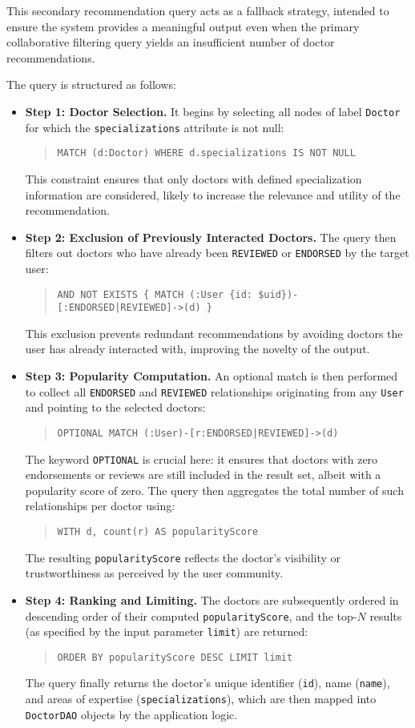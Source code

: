 This secondary recommendation query acts as a fallback strategy, intended to ensure the system provides a meaningful output even when the primary collaborative filtering query yields an insufficient number of doctor recommendations.

The query is structured as follows:
\begin{itemize}
	\item \textbf{Step 1: Doctor Selection.} It begins by selecting all nodes of label \texttt{Doctor} for which the \texttt{specializations} attribute is not null:
	\begin{quote}
		\texttt{MATCH (d:Doctor) WHERE d.specializations IS NOT NULL}
	\end{quote}
	This constraint ensures that only doctors with defined specialization information are considered, likely to increase the relevance and utility of the recommendation.
	
	\item \textbf{Step 2: Exclusion of Previously Interacted Doctors.} The query then filters out doctors who have already been \texttt{REVIEWED} or \texttt{ENDORSED} by the target user:
	\begin{quote}
		\texttt{AND NOT EXISTS \{ MATCH (:User \{id: \$uid\})-[:ENDORSED|REVIEWED]->(d) \}}
	\end{quote}
	This exclusion prevents redundant recommendations by avoiding doctors the user has already interacted with, improving the novelty of the output.
	
	\item \textbf{Step 3: Popularity Computation.} An optional match is then performed to collect all \texttt{ENDORSED} and \texttt{REVIEWED} relationships originating from any \texttt{User} and pointing to the selected doctors:
	\begin{quote}
		\texttt{OPTIONAL MATCH (:User)-[r:ENDORSED|REVIEWED]->(d)}
	\end{quote}
	The keyword \texttt{OPTIONAL} is crucial here: it ensures that doctors with zero endorsements or reviews are still included in the result set, albeit with a popularity score of zero. The query then aggregates the total number of such relationships per doctor using:
	\begin{quote}
		\texttt{WITH d, count(r) AS popularityScore}
	\end{quote}
	The resulting \texttt{popularityScore} reflects the doctor's visibility or trustworthiness as perceived by the user community.
	
	\item \textbf{Step 4: Ranking and Limiting.} The doctors are subsequently ordered in descending order of their computed \texttt{popularityScore}, and the top-$N$ results (as specified by the input parameter \texttt{limit}) are returned:
	\begin{quote}
		\texttt{ORDER BY popularityScore DESC LIMIT limit}
	\end{quote}
	The query finally returns the doctor's unique identifier (\texttt{id}), name (\texttt{name}), and areas of expertise (\texttt{specializations}), which are then mapped into \texttt{DoctorDAO} objects by the application logic.
\end{itemize}

